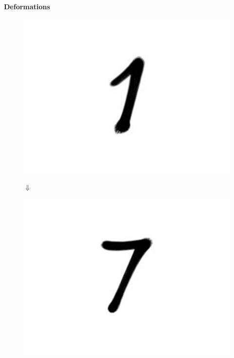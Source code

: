 \documentclass[10pt]{beamer}
\begin{document}
\begin{darkframes}
\begin{frame}[label=stable]{\subsecname}
\begin{columns}
            \begin{center}
            \textbf{Deformations}
            \begin{figure}
            \centering
            \includegraphics[height=0.25\textheight]{resources/dig1.jpg}
            
            $\Downarrow$ \vspace{0.01\textheight}
            
            \includegraphics[height=0.25\textheight]{resources/dig7.jpg}
            \end{figure}
            \end{center}
    \end{columns}
    \end{frame}
    

\end{darkframes}
\end{document}
